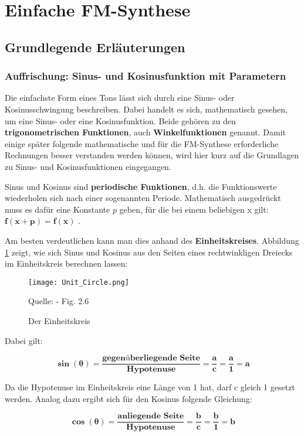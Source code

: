 \section{Einfache FM-Synthese}
\label{einfacheFM}
\FloatBarrier
\subsection{Grundlegende Erläuterungen}
\subsubsection{Auffrischung: Sinus- und Kosinusfunktion mit Parametern}
Die einfachste Form eines Tons lässt sich durch eine Sinus- oder Kosinusschwingung beschreiben. Dabei handelt es sich, mathematisch gesehen, um eine Sinus- oder eine Kosinusfunktion. Beide gehören zu den \textbf{trigonometrischen Funktionen}, auch \textbf{Winkelfunktionen} genannt. Damit einige später folgende mathematische und für die FM-Synthese erforderliche Rechnungen besser verstanden werden können, wird hier kurz auf die Grundlagen zu Sinus- und Kosinusfunktionen eingegangen. 

Sinus und Kosinus sind \textbf{periodische Funktionen}, d.h. die Funktionswerte wiederholen sich nach einer sogenannten Periode. Mathematisch ausgedrückt muss es dafür eine Konstante $p$  geben, für die bei einem beliebigen x gilt: $\bm{f(x + p) =  f(x)}$ .

Am besten verdeutlichen kann man dies anhand des \textbf{Einheitskreises}. Abbildung \ref{fig:unitcircle} zeigt, wie sich Sinus und Kosinus aus den Seiten eines rechtwinkligen Dreiecks im Einheitskreis berechnen lassen:

\begin{figure} [ht]
\centering
\texttt{[image: Unit\_Circle.png]}
\caption{Der Einheitskreis}
\label{fig:unitcircle}
Quelle: \cite{fmtheory} - Fig. 2.6
\end{figure}

Dabei gilt: 

\begin{equation}\bm{\sin(\theta) = \frac{\textbf{gegenüberliegende Seite}}{\textbf{Hypotenuse}} = \frac{a}{c} = \frac{a}{1} = a}\end{equation}

Da die Hypotenuse im Einheitskreis eine Länge von 1 hat, darf c gleich 1 gesetzt werden.
Analog dazu ergibt sich für den Kosinus folgende Gleichung:

\begin{equation}\bm{\cos(\theta) = \frac{\textbf{anliegende Seite}}{\textbf{Hypotenuse}} = \frac{b}{c} = \frac{b}{1} = b}\end{equation} \cite[s. 22 - 27]{fmtheory} \\

